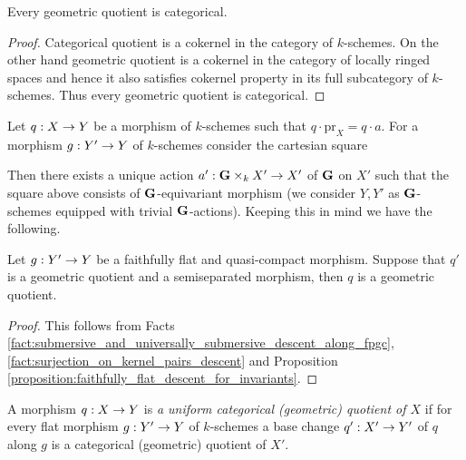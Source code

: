 \begin{fact}\label{fact:geometric_quotients_are_categorical}
Every geometric quotient is categorical.
\end{fact}
\begin{proof}
Categorical quotient is a cokernel in the category of $k$-schemes. On the other hand geometric quotient is a cokernel in the category of locally ringed spaces and hence it also satisfies cokernel property in its full subcategory of $k$-schemes. Thus every geometric quotient is categorical.
\end{proof}
\noindent
Let $q:X\rightarrow Y$ be a morphism of $k$-schemes such that $q\cdot \mathrm{pr}_X = q\cdot a$. For a morphism $g:Y'\rightarrow Y$ of $k$-schemes consider the cartesian square
\begin{center}
\end{center} 
Then there exists a unique action $a':\mathbf{G} \times_kX' \rightarrow X'$ of $\mathbf{G}$ on $X'$ such that the square above consists of $\mathbf{G}$-equivariant morphism (we consider $Y,Y'$ as $\mathbf{G}$-schemes equipped with trivial $\mathbf{G}$-actions). Keeping this in mind we have the following.

\begin{corollary}\label{corollary:geometric_quotients_descent_along_fpqc}
Let $g:Y'\rightarrow Y$ be a faithfully flat and quasi-compact morphism. Suppose that $q'$ is a geometric quotient and a semiseparated morphism, then $q$ is a geometric quotient.
\end{corollary}
\begin{proof}
This follows from Facts \ref{fact:submersive_and_universally_submersive_descent_along_fpgc}, \ref{fact:surjection_on_kernel_pairs_descent} and Proposition \ref{proposition:faithfully_flat_descent_for_invariants}.
\end{proof}

\begin{definition}
A morphism $q:X\rightarrow Y$ is \textit{a uniform categorical (geometric) quotient of $X$} if for every flat morphism $g:Y'\rightarrow Y$ of $k$-schemes a base change $q':X'\rightarrow Y'$ of $q$ along $g$ is a categorical (geometric) quotient of $X'$. 
\end{definition}

